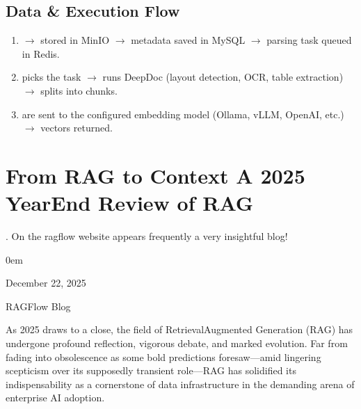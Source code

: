 \documentclass[letterpaper,10pt,english]{sphinxmanual}
\begin{document}
\section{Data \& Execution Flow}
\label{\detokenize{architecture:data-execution-flow}}\begin{enumerate}
%
\item {} 
\sphinxAtStartPar
{} \(\rightarrow\) stored in MinIO \(\rightarrow\) metadata saved in MySQL \(\rightarrow\) parsing task queued in Redis.

\item {} 
\sphinxAtStartPar
{} picks the task \(\rightarrow\) runs DeepDoc (layout detection, OCR, table extraction) \(\rightarrow\) splits into chunks.

\item {} 
\sphinxAtStartPar
{} are sent to the configured embedding model (Ollama, vLLM, OpenAI, etc.) \(\rightarrow\) vectors returned.

\end{enumerate}

\sphinxstepscope


\chapter{From RAG to Context \sphinxhyphen{} A 2025 Year\sphinxhyphen{}End Review of RAG}
\label{\detokenize{blog-dec-2025:from-rag-to-context-a-2025-year-end-review-of-rag}}\label{\detokenize{blog-dec-2025::doc}}
\sphinxAtStartPar
{}. On the ragflow website appears frequently a very insightful blog!

\begin{DUlineblock}{0em}
\item[]  December 22, 2025
\item[]  RAGFlow Blog
\end{DUlineblock}

\sphinxAtStartPar
As 2025 draws to a close, the field of Retrieval\sphinxhyphen{}Augmented Generation
(RAG) has undergone profound reflection, vigorous debate, and marked
evolution. Far from fading into obsolescence as some bold predictions
foresaw—amid lingering scepticism over its supposedly transient role—RAG
has solidified its indispensability as a cornerstone of data
infrastructure in the demanding arena of enterprise AI adoption.
\end{document}
